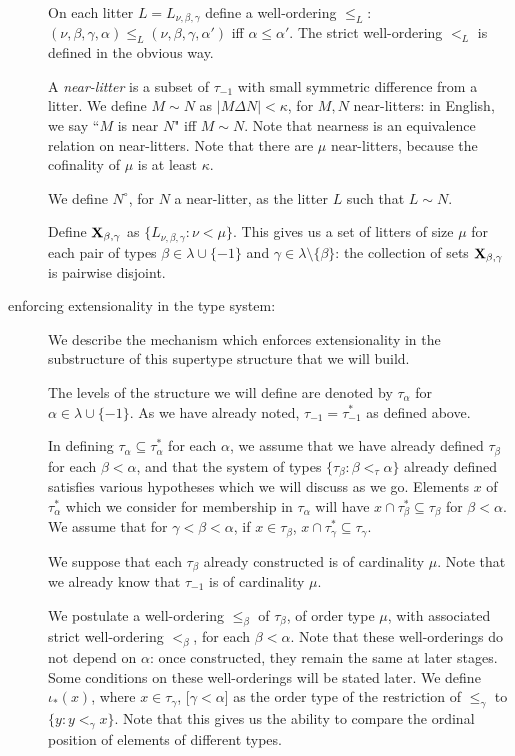 \documentclass[112pt]{article}
\begin{document}
\begin{description}
On each litter $L =  L_{\nu,\beta,\gamma}$ define a well-ordering $\leq_L$:  $(\nu,\beta,\gamma,\alpha) \leq_L (\nu,\beta,\gamma,\alpha')$  iff $\alpha\leq \alpha'$.
The strict well-ordering $<_L$ is defined in the obvious way.

A {\em near-litter\/} is a subset of $\tau_{-1}$ with small symmetric difference from a litter.  We define $M \sim N$ as $|M \Delta N|<\kappa$, for $M,N$ near-litters:  in English, we say ``$M$ is near $N$" iff $M \sim N$.  Note that nearness is an equivalence relation on near-litters.  Note that there are $\mu$ near-litters, because the cofinality of $\mu$ is at least $\kappa$.

We define $N^\circ$, for $N$ a near-litter, as the litter $L$ such that $L \sim N$.  

Define ${\bf X}_{\beta,\gamma}$ as $\{L_{\nu,\beta,\gamma}:\nu < \mu\}$.  This gives us a set of litters of size $\mu$ for each pair of
types $\beta\in \lambda \cup \{-1\}$ and $\gamma \in \lambda \setminus \{\beta\}$:  the collection of sets ${\bf X}_{\beta,\gamma}$ is pairwise disjoint.  

\item[enforcing extensionality in the type system:]  We describe the mechanism which enforces extensionality in the substructure of this supertype structure that we will build.

The levels of the structure we will define are denoted by $\tau_\alpha$ for \newline $\alpha \in \lambda \cup \{-1\}$.  As we have already noted, $\tau_{-1}=\tau^*_{-1}$ as defined above.

In defining $\tau_\alpha \subseteq \tau^*_\alpha$ for each $\alpha$, we assume that we have already defined $\tau_\beta$ for each $\beta<\alpha$, and that the system of types $\{\tau_\beta:\beta <_\tau \alpha\}$ already defined satisfies various hypotheses which we will discuss as we go.
Elements $x$ of $\tau^*_\alpha$ which we consider for membership in $\tau_\alpha$ will have $x \cap \tau^*_\beta \subseteq \tau_\beta$ for $\beta<\alpha$.  We assume that for $\gamma<\beta<\alpha$, if $x \in \tau_\beta$, $x \cap \tau^*_\gamma \subseteq \tau_\gamma$.

We suppose that each $\tau_\beta$ already constructed is of cardinality $\mu$.  Note that we already know that
$\tau_{-1}$ is of cardinality $\mu$.


We postulate a well-ordering $\leq_\beta$ of $\tau_\beta$, of order type $\mu$, with associated strict well-ordering $<_\beta$, for each $\beta<\alpha$.   Note that these well-orderings do not depend on $\alpha$:  once constructed, they remain the same at later stages.  Some conditions on these well-orderings will be stated later.  We define $\iota_*(x)$, where $x \in \tau_\gamma$, $[\gamma <\alpha$] as the order type of the restriction of $\leq_\gamma$ to
$\{y:y <_\gamma x\}$.  Note that this gives us the ability to compare the ordinal position of elements of different types.


\end{description}
\end{document}
